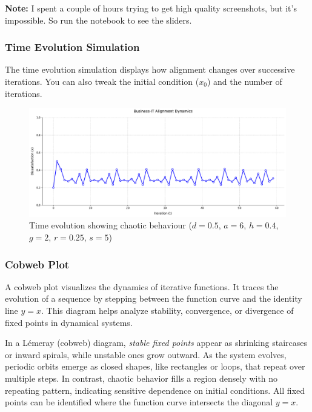 \documentclass[a4paper, 10pt]{article}
\begin{document}
{\footnotesize \textbf{Note:} I spent a couple of hours trying to get high quality screenshots, but it's impossible. So run the notebook to see the sliders.
}

\subsubsection{Time Evolution Simulation}
The time evolution simulation displays how alignment changes over successive iterations.
You can also tweak the initial condition ($x_0$) and the number of iterations. 

\begin{figure}[h]
	\centering
	\includegraphics[width=1\textwidth]{../images/results/time-evolution.pdf}
	\caption{Time evolution showing chaotic behaviour ($d = 0.5$, $a = 6$, $h = 0.4$, $g = 2$, $r = 0.25$, $s = 5$)}
	\label{fig:time_sim}
\end{figure}

\subsubsection{Cobweb Plot}
A cobweb plot visualizes the dynamics of iterative functions. 
It traces the evolution of a sequence by stepping between the function curve and the identity line $y = x$. This diagram helps analyze stability, convergence, or divergence of fixed points in dynamical systems. 

In a Lémeray (cobweb) diagram, \textit{stable fixed points} appear as shrinking staircases or inward spirals, while unstable ones grow outward.
As the system evolves, periodic orbits emerge as closed shapes, like rectangles or loops, that repeat over multiple steps.
In contrast, chaotic behavior fills a region densely with no repeating pattern, indicating sensitive dependence on initial conditions.
All fixed points can be identified where the function curve intersects the diagonal $y = x$.
\end{document}
